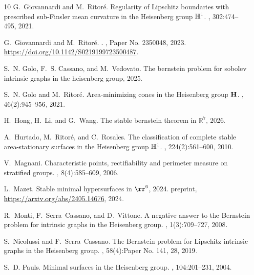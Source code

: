 \begin{thebibliography}{10}
G.~Giovannardi and M.~Ritor\'{e}.
\newblock Regularity of {L}ipschitz boundaries with prescribed sub-{F}insler mean curvature in the {H}eisenberg group {$\Bbb H^1$}.
, 302:474--495, 2021.

G.~Giovannardi and M.~Ritor\'{e}.
.
, Paper No. 2350048, 2023.
\newblock \url{https://doi.org/10.1142/S0219199723500487}.

S.~N. Golo, F.~S. Cassano, and M.~Vedovato.
\newblock The bernstein problem for sobolev intrinsic graphs in the heisenberg group, 2025.

S.~N. Golo and M.~Ritor\'{e}.
\newblock Area-minimizing cones in the {H}eisenberg group {${\bf H}$}.
, 46(2):945--956, 2021.

H.~Hong, H.~Li, and G.~Wang.
\newblock The stable bernstein theorem in $\mathbb{R}^{7}$, 2026.

A.~Hurtado, M.~Ritor\'{e}, and C.~Rosales.
\newblock The classification of complete stable area-stationary surfaces in the {H}eisenberg group {$\Bbb H^1$}.
, 224(2):561--600, 2010.

V.~Magnani.
\newblock Characteristic points, rectifiability and perimeter measure on stratified groups.
, 8(4):585--609, 2006.

L.~Mazet.
\newblock Stable minimal hypersurfaces in $\rr^6$, 2024.
\newblock preprint, \url{https://arxiv.org/abs/2405.14676}, 2024.

R.~Monti, F.~Serra~Cassano, and D.~Vittone.
\newblock A negative answer to the {B}ernstein problem for intrinsic graphs in the {H}eisenberg group.
, 1(3):709--727, 2008.

S.~Nicolussi and F.~Serra~Cassano.
\newblock The {B}ernstein problem for {L}ipschitz intrinsic graphs in the {H}eisenberg group.
, 58(4):Paper No. 141, 28, 2019.

S.~D. Pauls.
\newblock Minimal surfaces in the {H}eisenberg group.
, 104:201--231, 2004.


\end{thebibliography}
